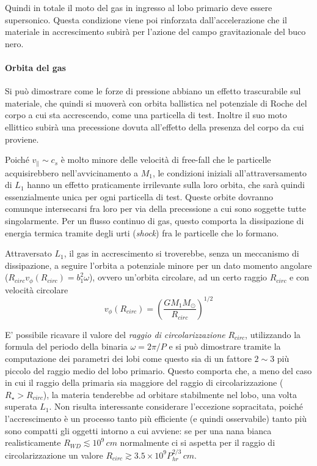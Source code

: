 \documentclass[a4paperbi]{article}
\begin{document}
	Quindi in totale il moto del gas in ingresso al lobo primario deve essere supersonico. Questa condizione viene poi rinforzata dall'accelerazione che il materiale in accrescimento subirà per l'azione del campo gravitazionale del buco nero.

	\paragraph{Orbita del gas}	
	Si può dimostrare come le forze di pressione abbiano un effetto trascurabile sul materiale, che quindi si muoverà con orbita ballistica nel potenziale di Roche del corpo a cui sta accrescendo, come una particella di test. Inoltre il suo moto ellittico subirà una precessione dovuta all'effetto della presenza del corpo da cui proviene.
	
	Poiché $v_\parallel\sim c_s$ è molto minore delle velocità di free-fall che le particelle acquisirebbero nell'avvicinamento a $M_1$, le condizioni iniziali all'attraversamento di $L_1$ hanno un effetto praticamente irrilevante sulla loro orbita, che sarà quindi essenzialmente unica per ogni particella di test. Queste orbite dovranno comunque intersecarsi fra loro per via della precessione a cui sono soggette tutte singolarmente. Per un flusso continuo di gas, questo comporta la dissipazione di energia termica tramite degli urti (\textit{shock}) fra le particelle che lo formano. 
	
	Attraversato $L_1$, il gas in accrescimento si troverebbe, senza un meccanismo di dissipazione, a seguire l'orbita a potenziale minore per un dato momento angolare ($R_{circ}v_\phi(R_{circ})=b_1^2\omega$), ovvero un'orbita circolare, ad un certo raggio $R_{circ}$ e con velocità circolare
	\begin{equation}
		v_\phi(R_{circ})=\left(\frac{GM_1M_\odot}{R_{circ}}\right)^{1/2}
	\end{equation}
	
	E' possibile ricavare il valore del \textit{raggio di circolarizzazione} $R_{circ}$, utilizzando la formula del periodo della binaria $\omega=2\pi/P$ e si può dimostrare tramite la computazione dei parametri dei lobi come questo sia di un fattore $2\sim3$ più piccolo del raggio medio del lobo primario. Questo comporta che, a meno del caso in cui il raggio della primaria sia maggiore del raggio di circolarizzazione ($R_\star>R_{circ}$), la materia tenderebbe ad orbitare stabilmente nel lobo, una volta superata $L_1$.
	Non risulta interessante considerare l'eccezione sopracitata, poiché l'accrescimento è un processo tanto più efficiente (e quindi osservabile) tanto più sono compatti gli oggetti intorno a cui avviene: se per una nana bianca realisticamente $R_{WD}\lesssim10^9\,cm$ normalmente ci si aspetta per il raggio di circolarizzazione un valore $R_{circ}\gtrsim3.5\times10^9P_{hr}^{2/3}\,cm$.
\end{document}

